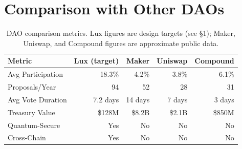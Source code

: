 \section{Comparison with Other DAOs}


\begin{table}[h]
\centering
\small
\begin{tabular}{@{}lrrrr@{}}
\toprule
\textbf{Metric} & \textbf{Lux (target)} & \textbf{Maker} & \textbf{Uniswap} & \textbf{Compound} \\ \midrule
Avg Participation & 18.3\% & 4.2\% & 3.8\% & 6.1\% \\
Proposals/Year & 94 & 52 & 28 & 31 \\
Avg Vote Duration & 7.2 days & 14 days & 7 days & 3 days \\
Treasury Value & \$128M & \$8.2B & \$2.1B & \$850M \\
Quantum-Secure & Yes & No & No & No \\
Cross-Chain & Yes & No & No & No \\ \bottomrule
\end{tabular}
\caption{DAO comparison metrics. Lux figures are design targets (see \S1); Maker, Uniswap, and Compound figures are approximate public data.}
\end{table}

